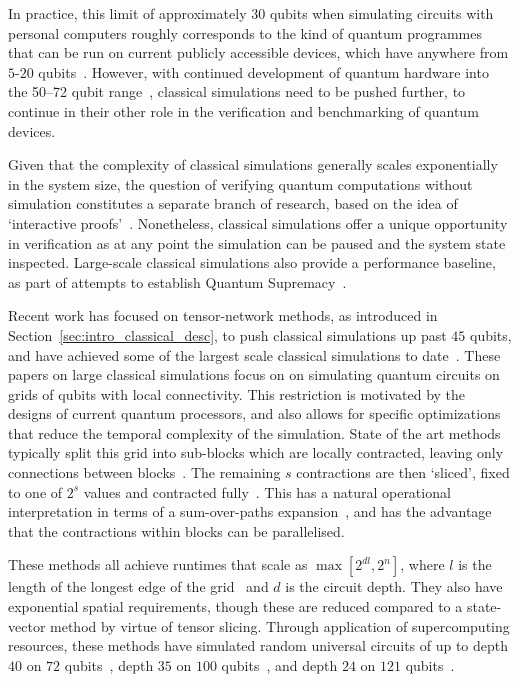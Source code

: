 In practice, this limit of approximately $30$ qubits when simulating circuits with personal computers roughly corresponds to the kind of quantum programmes that can be run on current publicly accessible devices, which have anywhere from $5$-$20$ qubits~\cite{IBMQ,RigettiQPU}. However, with continued development of quantum hardware into the 50--72 qubit range~\cite{IBM50,GoogleBristlecone}, classical simulations need to be pushed further, to continue in their other role in the verification and benchmarking of quantum devices.\par
Given that the complexity of classical simulations generally scales exponentially in the system size, the question of verifying quantum computations without simulation constitutes a separate branch of research, based on the idea of `interactive proofs'~\cite{Aharonov2017,Mahadev2018}. Nonetheless, classical simulations offer a unique opportunity in verification as at any point the simulation can be paused and the system state inspected. Large-scale classical simulations also provide a performance baseline, as part of attempts to establish Quantum Supremacy~\cite{Preskill2012,Aaronson2016}.\par
Recent work has focused on tensor-network methods, as introduced in Section~\ref{sec:intro_classical_desc}, to push classical simulations up past $45$ qubits, and have achieved some of the largest scale classical simulations to date~\cite{Pendault2017,Chen2018,Chen2018b,Markov2018,Villalonga2019}. These papers on large classical simulations focus on on simulating quantum circuits on grids of qubits with local connectivity. This restriction is motivated by the designs of current quantum processors, and also allows for specific optimizations that reduce the temporal complexity of the simulation. State of the art methods typically split this grid into sub-blocks which are locally contracted, leaving only connections between blocks~\cite{Pendault2017,Chen2018b,Markov2018,Villalonga2018}. The remaining $s$ contractions are then `sliced', fixed to one of $2^{s}$ values and contracted fully~\cite{Pendault2017}. This has a natural operational interpretation in terms of a sum-over-paths expansion~\cite{Markov2018}, and has the advantage that the contractions within blocks can be parallelised.\par
These methods all achieve runtimes that scale as $\max \left[ 2^{dl}, 2^{n}\right]$, where $l$ is the length of the longest edge of the grid~\cite{Markov2005} and $d$ is the circuit depth. They also have exponential spatial requirements, though these are reduced compared to a state-vector method by virtue of tensor slicing. Through application of supercomputing resources, these methods have simulated random universal circuits of up to depth $40$ on $72$ qubits~\cite{Villalonga2018}, depth $35$ on $100$ qubits~\cite{Chen2018}, and depth $24$ on $121$ qubits~\cite{Villalonga2019}.\par
